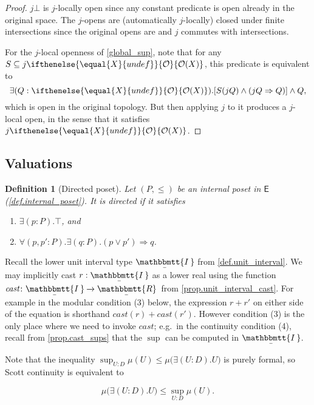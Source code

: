 \documentclass[reqno,11pt]{amsproc}
\theoremstyle{plain}
\newtheorem{definition}[theorem]{Definition}
\theoremstyle{definition}
\newcommand{\cat}[1]{\mathsf{#1}}
\renewcommand{\to}[1][]{\xrightarrow{#1}}
\newcommand{\ubar}[1]{\underaccent{\bar}{#1}}
\newcommand{\internal}[1]{\raisebox{-.03ex}{$\mathbbmtt{#1}$}}
\newcommand{\hs}{\hspace{1pt}}
\newcommand{\trr}{\internal{R}}
\newcommand{\tii}{\ubar{\internal{I\hs\hs}}\!\hs}
\newcommand{\tlrr}{\ubar{\trr}\hs}
\newcommand{\cast}{\textit{cast}}
\newcommand{\Op}[1][undef]{\ifthenelse{\equal{#1}{undef}}{\mathcal{O}}{\mathcal{O}(#1)}}
\newcommand{\imp}{\Rightarrow}
\let\originalleft\left
\let\originalright\right
\renewcommand{\left}{\mathopen{}\mathclose\bgroup\originalleft}
\renewcommand{\right}{\aftergroup\egroup\originalright}
\numberwithin{equation}{section}
\begin{document}
\begin{proof}
	$j\bot$ is $j$-locally open since any constant predicate is open already in the original space.	The $j$-opens are (automatically $j$-locally) closed under finite intersections since the original opens are and $j$ commutes with intersections. 

	For the $j$-local openness of \eqref{global_sup}, note that for any $S\subseteq j\Op[X]$, this predicate is equivalent to
	\[
		\exists (Q : \Op[X]) . \left[ S(jQ) \land (jQ \imp  Q) \right] \land Q,
	\]
	which is open in the original topology. But then applying $j$ to it produces a $j$-local open, in the sense that it satisfies $j \Op[X]$.
\end{proof}

\subsection{Valuations}\label{sec.valuations}

\begin{definition}[Directed poset]\label{def.directed}
Let $(P,\le)$ be an internal poset in $\cat{E}$ (\cref{def.internal_poset}). It is \emph{directed} if it satisfies
\begin{enumerate}
	\item $\exists(p:P).\top$, and
	\item $\forall(p,p':P).\exists(q:P).(p\lor p')\imp q$.
\end{enumerate}
\end{definition}


Recall the lower unit interval type $\tii$ from \cref{def.unit_interval}. We may implicitly cast $r:\tii$ as a lower real using the function $\cast\colon\tii\to\tlrr$ from \cref{prop.unit_interval_cast}. For example in the modular condition (3) below, the expression $r+r'$ on either side of the equation is shorthand $\cast(r)+\cast(r')$. However condition (3) is the only place where we need to invoke $\cast$; e.g.\ in the continuity condition (4), recall from \cref{prop.cast_sups} that the $\sup$ can be computed in $\tii$.

Note that the inequality $\sup_{U: D}\mu(U)\le\mu\big(\exists(U:D).U\big)$ is purely formal, so Scott continuity is equivalent to

\begin{equation}
	\label{eqn.scott_continuity}
	\mu\big(\exists(U:D).U\big)\le\sup_{U: D}\mu(U).
\end{equation}
\end{document}
